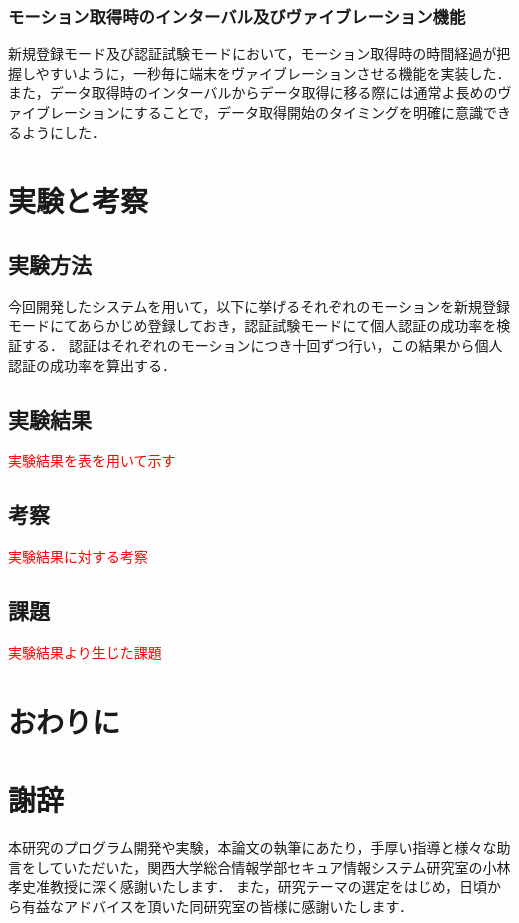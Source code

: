 \documentclass[11pt]{jreport}
\begin{document}
        \subsection{モーション取得時のインターバル及びヴァイブレーション機能}
        新規登録モード及び認証試験モードにおいて，モーション取得時の時間経過が把握しやすいように，一秒毎に端末をヴァイブレーションさせる機能を実装した．
        また，データ取得時のインターバルからデータ取得に移る際には通常よ長めのヴァイブレーションにすることで，データ取得開始のタイミングを明確に意識できるようにした．

\chapter{実験と考察}
	\section{実験方法}
	今回開発したシステムを用いて，以下に挙げるそれぞれのモーションを新規登録モードにてあらかじめ登録しておき，認証試験モードにて個人認証の成功率を検証する．
    認証はそれぞれのモーションにつき十回ずつ行い，この結果から個人認証の成功率を算出する．

	\section{実験結果}
	\textcolor{red}{実験結果を表を用いて示す}

	\section{考察}
    \textcolor{red}{実験結果に対する考察}

	\section{課題}
	\textcolor{red}{実験結果より生じた課題}

\chapter{おわりに}

\chapter*{謝辞}
本研究のプログラム開発や実験，本論文の執筆にあたり，手厚い指導と様々な助言をしていただいた，関西大学総合情報学部セキュア情報システム研究室の小林孝史准教授に深く感謝いたします．
また，研究テーマの選定をはじめ，日頃から有益なアドバイスを頂いた同研究室の皆様に感謝いたします．
\end{document}
